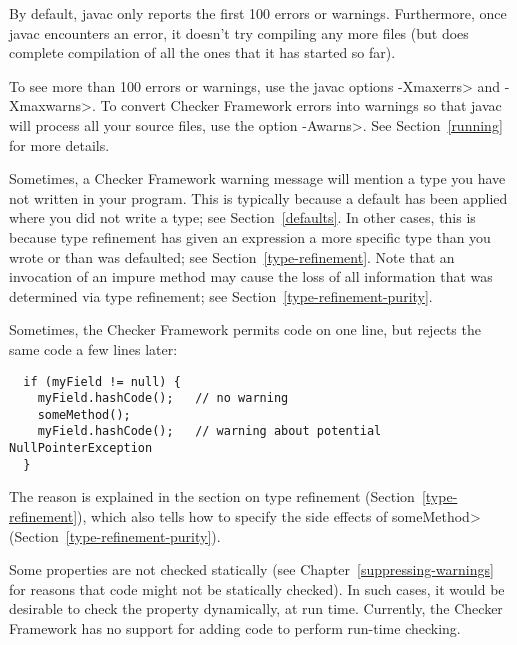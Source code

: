 By default, javac only reports the first 100 errors or warnings.
Furthermore, once javac encounters an error, it doesn't try compiling any
more files (but does complete compilation of all the ones that it has
started so far).

To see more than 100 errors or warnings, use the javac options \<-Xmaxerrs>
and \<-Xmaxwarns>.  To convert Checker Framework errors into warnings so
that javac will process all your source files, use the option \<-Awarns>.
See Section~\ref{running} for more details.



Sometimes, a Checker Framework warning message will mention a type you have
not written in your program.  This is typically because a default has been
applied where you did not write a type; see Section~\ref{defaults}.  In
other cases, this is because type refinement has given an
expression a more specific type than you wrote or than was defaulted; see
Section~\ref{type-refinement}.
Note that an invocation of an impure method may cause the loss of all
information that was determined via type refinement; see
Section~\ref{type-refinement-purity}.



Sometimes, the Checker Framework permits code on one line, but rejects the
same code a few lines later:

\begin{Verbatim}
  if (myField != null) {
    myField.hashCode();   // no warning
    someMethod();
    myField.hashCode();   // warning about potential NullPointerException
  }
\end{Verbatim}

The reason is explained in the section on type refinement
(Section~\ref{type-refinement}), which also tells how to specify the side
effects of \<someMethod> (Section~\ref{type-refinement-purity}).



Some properties are not checked statically (see
Chapter~\ref{suppressing-warnings} for reasons that code might not be
statically checked).  In such cases, it would be desirable to check the
property dynamically, at run time.
Currently, the Checker Framework has no support for adding code to perform
run-time checking.

